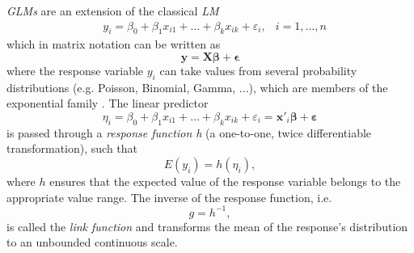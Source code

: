 \textit{\acp{GLM}} are an extension of the classical \textit{\ac{LM}}
\begin{equation}
\begin{aligned}
&y_{i}=\beta_{0}+\beta_{1} x_{i 1}+\ldots+\beta_{k} x_{i k}+\varepsilon_{i}, &i=1, \ldots, n
\end{aligned}
\end{equation}
which in matrix notation can be written as
\begin{equation}
 \bm{y} = \bm{X}\bm{\beta} + \bm{\epsilon} 
\end{equation}
where the response variable $y_i$ can take values from several probability distributions (e.g. Poisson, Binomial, Gamma, ...), which are members of the exponential family \citep{fahrmeir2003regression}. The linear predictor 
\begin{equation} 
\eta_i = \beta_{0}+\beta_{1} x_{i 1}+\ldots+\beta_{k} x_{i k}+\varepsilon_{i} = \bm{x'}_i \bm{\beta} + \bm{\varepsilon}
\label{eq:linear_predictor_glm}
\end{equation}
is passed through a \textit{response function h} (a one-to-one, twice differentiable transformation), such that
\begin{equation}
 E(y_i) = h(\eta_i),
\label{eq:response_function}
\end{equation}
where $h$ ensures that the expected value of the response variable belongs to the appropriate value range. The inverse of the response function, i.e.
\begin{equation}
g = h^{-1},
\label{eq:link_function}
\end{equation} 
is called the \textit{link function} and transforms the mean of the response's distribution to an unbounded continuous scale.




